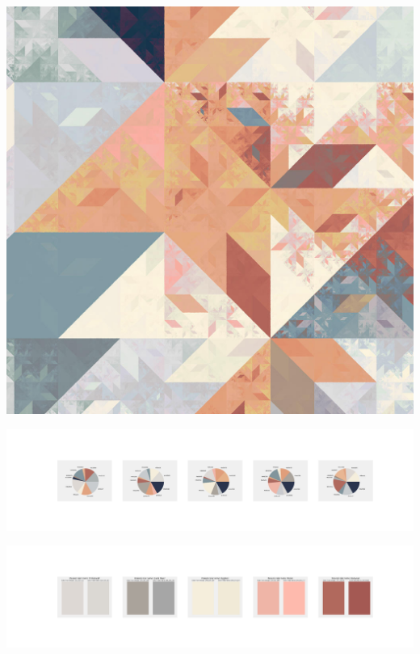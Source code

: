 \documentclass[11pt]{article}
\begin{document}
\begin{landscape}
    \begin{center}
    \includegraphics[width=\textwidth]{./nbimg/file (358).jpg}
    \end{center}

    \begin{center}
    \includegraphics[width=250mm]{./nbimg/pie-287.jpg}
    \end{center}

    \begin{center}
    \includegraphics[width=250mm]{./nbimg/peak-287.jpg}
    \end{center}
    


\end{landscape}
\end{document}

